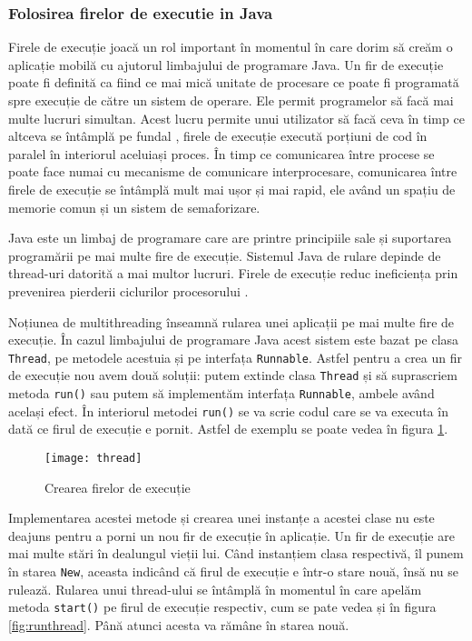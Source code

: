 \documentclass[../IoMusT.tex]{subfiles}
\begin{document}
\subsubsection{Folosirea firelor de executie in Java}
Firele de execuție joacă un rol important în momentul în care dorim să creăm o aplicație mobilă cu ajutorul limbajului de programare Java. Un fir de execuție poate fi definită ca fiind ce mai mică  unitate de procesare ce poate fi programată spre execuție de către un sistem de operare. Ele permit programelor să facă mai multe lucruri simultan. Acest lucru permite unui utilizator să facă ceva în timp ce altceva se întâmplă pe fundal \cite{articleThread}, firele de execuție execută porțiuni de cod  în paralel în interiorul aceluiași proces. În timp ce comunicarea între procese se poate face numai cu mecanisme de comunicare interprocesare, comunicarea între firele de execuție se întâmplă mult mai ușor și mai rapid, ele având un spațiu de memorie comun și un sistem de semaforizare.
\\
\par Java este un limbaj de programare care are printre principiile sale și suportarea programării pe mai multe fire de execuție. Sistemul Java de rulare depinde de thread-uri datorită a mai multor lucruri. Firele de execuție reduc ineficiența prin prevenirea pierderii ciclurilor  procesorului \cite{Thread}.
\\ 
\par Noțiunea de multithreading înseamnă rularea unei aplicații pe mai multe fire de execuție. În cazul limbajului de programare Java acest sistem este bazat pe clasa \verb|Thread|, pe metodele acestuia și pe interfața \verb|Runnable|. Astfel pentru a crea un fir de execuție nou avem două soluții: putem extinde clasa \verb|Thread| și să suprascriem metoda \verb|run()| sau putem să implementăm interfața \verb|Runnable|, ambele având același efect. În interiorul metodei \verb|run()| se va scrie codul care se va executa în dată ce firul de execuție e pornit. Astfel de exemplu se poate vedea în figura \ref{fig:thread}.
\begin{figure}[h]
\centering
\texttt{[image: thread]}
\caption{Crearea firelor de execuție}
\label{fig:thread}
\end{figure}
Implementarea acestei metode și crearea unei instanțe a acestei clase nu este deajuns pentru a porni un nou fir de execuție în aplicație. Un fir de execuție are mai multe stări în dealungul vieții lui. Când instanțiem clasa respectivă, îl punem în starea \verb|New|, aceasta indicând că firul de execuție e într-o stare nouă, însă nu se rulează. Rularea unui thread-ului se întâmplă în momentul în care apelăm metoda \verb|start()| pe firul de execuție respectiv, cum se pate vedea și în figura \ref{fig:runthread}. Până atunci acesta va rămâne în starea nouă.
\end{document}
